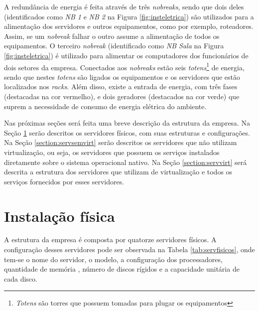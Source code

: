 A redundância de energia é feita através de três \textit{nobreaks}, sendo que dois deles (identificados como \textit{NB 1} e \textit{NB 2} na 
Figura \ref{fig:insteletrica}) são utilizados para a alimentação dos servidores e outros equipamentos, como por exemplo, roteadores. Assim, se um 
\textit{nobreak} falhar o outro assume a alimentação de todos os equipamentos. O terceiro \textit{nobreak} (identificado como \textit{NB Sala} 
na Figura \ref{fig:insteletrica}) é utilizado para alimentar os computadores dos funcionários de dois setores da empresa. Conectados aos 
\textit{nobreaks} estão seis \textit{totens}\footnote[1]{\textit{Totens} são torres que possuem tomadas para plugar os equipamentos} de energia, 
sendo que nestes \textit{totens} são ligados os equipamentos e os servidores que estão localizados nos \textit{racks}. Além disso, existe a 
entrada de energia, com três fases (destacadas na cor vermelho), e dois geradores (destacados na cor verde) que suprem a necessidade de consumo 
de energia elétrica do ambiente.

Nas próximas seções será feita uma breve descrição da estrutura da empresa. Na Seção \ref{section:fisico} serão descritos os servidores físicos, 
com suas estruturas e configurações. Na Seção \ref{section:servsemvirt} serão descritos os servidores que não utilizam virtualização, ou seja, 
os servidores que possuem os serviços instalados diretamente sobre o sistema operacional nativo. Na Seção \ref{section:servvirt} será descrita a 
estrutura dos servidores que utilizam de virtualização e todos os serviços fornecidos por esses servidores.

\section{Instalação física}
\label{section:fisico}

A estrutura da empresa é composta por quatorze servidores físicos. A configuração desses servidores pode ser observada na 
Tabela \ref{tab:servfisicos}, onde tem-se o nome do servidor, o modelo, a configuração dos processadores, quantidade de memória
, número de discos rígidos e a capacidade unitária de cada disco.

